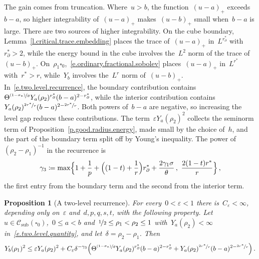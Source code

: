 \documentclass[11pt,letterpaper]{article}
\numberwithin{equation}{section}
\newtheorem{proposition}[theorem]{Proposition}
\theoremstyle{definition}
\newcommand{\eps}{\varepsilon}
\newcommand{\nf}{\nicefrac}
\newcommand{\cu}{\square}
\newcommand{\Csub}{\mathcal C_{\mathrm{sub}}}
\begin{document}
The gain comes from truncation. Where~$u>b$, the function~$(u-a)_+$ exceeds~$b-a$, so higher integrability of~$(u-a)_+$ makes~$(u-b)_+$ small when~$b-a$ is large. There are two sources of higher integrability. On the cube boundary, Lemma~\ref{l.critical.trace.embedding} places the trace of~$(u-a)_+$ in~$L^{r_\partial^*}$ with~$r_\partial^*>2$, while the energy bound in the cube involves the~$L^2$ norm of the trace of~$(u-b)_+$. On~$\rho_1\cu_0$,~\eqref{e.ordinary.fractional.sobolev} places~$(u-a)_+$ in~$L^{r^*}$ with~$r^*>r$, while~$Y_b$ involves the~$L^r$ norm of~$(u-b)_+$. In~\eqref{e.two.level.recurrence}, the boundary contribution contains~$\Theta^{\nf{(1-\sigma_*)}\theta}Y_a(\rho_2)^{r_\partial^*}(b-a)^{2-r_\partial^*}$, while the interior contribution contains~$Y_a(\rho_2)^{\nf{2r^*}r}(b-a)^{2-\nf{2r^*}r}$. Both powers of~$b-a$ are negative, so increasing the level gap reduces these contributions. The term~$\eps Y_a(\rho_2)^2$ collects the seminorm term of Proposition~\ref{p.good.radius.energy}, made small by the choice of~$h$, and the part of the boundary term split off by Young's inequality. The power of~$(\rho_2-\rho_1)^{-1}$ in the recurrence is
\begin{equation}
	\gamma_3\coloneqq\max\Bigl\{1+\frac1p+\Bigl((1-t)+\frac1r\Bigr)r_\partial^*+\frac{2\gamma_1\sigma}{\theta}\,,\ \frac{2(1-t)r^*}{r}\Bigr\}\,,
	\label{e.recurrence.exponent}
\end{equation}
the first entry from the boundary term and the second from the interior term.

\begin{proposition}[A two-level recurrence]
\label{p.two.level.recurrence}
For every~$0<\eps<1$ there is~$C_\eps<\infty$, depending only on~$\eps$ and~$d,p,q,s,t$, with the following property. Let~$u\in\Csub(\cu_0)$,~$0\leq a<b$ and~$\nf12\leq\rho_1<\rho_2\leq1$ with~$Y_a(\rho_2)<\infty$ in~\eqref{e.two.level.quantity}, and let~$\delta=\rho_2-\rho_1$. Then
\begin{equation}
	Y_b(\rho_1)^2\leq\eps Y_a(\rho_2)^2+C_\eps\delta^{-\gamma_3}\Bigl(\Theta^{\nf{(1-\sigma_*)}{\theta}}Y_a(\rho_2)^{r_\partial^*}(b-a)^{2-r_\partial^*}+Y_a(\rho_2)^{\nf{2r^*}r}(b-a)^{2-\nf{2r^*}r}\Bigr)\,.
	\label{e.two.level.recurrence}
\end{equation}
\end{proposition}
\end{document}
